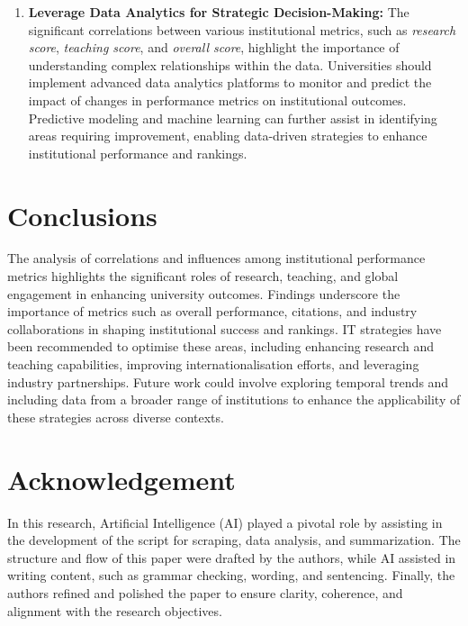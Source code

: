 \documentclass[sigconf]{acmart}
\begin{document}
\begin{enumerate}
	\item \textbf{Leverage Data Analytics for Strategic Decision-Making:} The significant correlations between various institutional metrics, such as \textit{research score}, \textit{teaching score}, and \textit{overall score}, highlight the importance of understanding complex relationships within the data. Universities should implement advanced data analytics platforms to monitor and predict the impact of changes in performance metrics on institutional outcomes. Predictive modeling and machine learning can further assist in identifying areas requiring improvement, enabling data-driven strategies to enhance institutional performance and rankings.
	
\end{enumerate}


\section{Conclusions}

The analysis of correlations and influences among institutional performance metrics highlights the significant roles of research, teaching, and global engagement in enhancing university outcomes. Findings underscore the importance of metrics such as overall performance, citations, and industry collaborations in shaping institutional success and rankings. IT strategies have been recommended to optimise these areas, including enhancing research and teaching capabilities, improving internationalisation efforts, and leveraging industry partnerships. Future work could involve exploring temporal trends and including data from a broader range of institutions to enhance the applicability of these strategies across diverse contexts.


\section*{Acknowledgement}

In this research, Artificial Intelligence (AI) played a pivotal role by assisting in the development of the script for scraping, data analysis, and summarization. The structure and flow of this paper were drafted by the authors, while AI assisted in writing content, such as grammar checking, wording, and sentencing. Finally, the authors refined and polished the paper to ensure clarity, coherence, and alignment with the research objectives.



\end{document}
